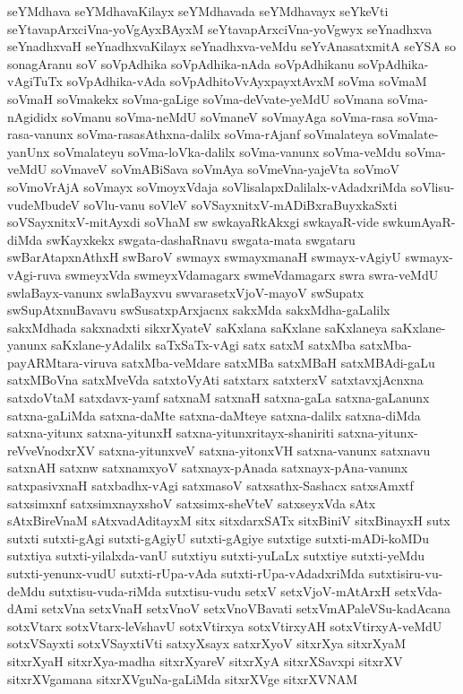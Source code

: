 {seYMdhava
seYMdhavaKilayx
seYMdhavada
seYMdhavayx
seYkeVti
seYtavapArxciVna-yoVgAyxBAyxM
seYtavapArxciVna-yoVgwyx
seYnadhxva
seYnadhxvaH
seYnadhxvaKilayx
seYnadhxva-veMdu
seYvAnasatxmitA
seYSA
so
sonagAranu
soV
soVpAdhika
soVpAdhika-nAda
soVpAdhikanu
soVpAdhika-vAgiTuTx
soVpAdhika-vAda
soVpAdhitoVvAyxpayxtAvxM
soVma
soVmaM
soVmaH
soVmakekx
soVma-gaLige
soVma-deVvate-yeMdU
soVmana
soVma-nAgididx
soVmanu
soVma-neMdU
soVmaneV
soVmayAga
soVma-rasa
soVma-rasa-vanunx
soVma-rasasAthxna-dalilx
soVma-rAjanf
soVmalateya
soVmalate-yanUnx
soVmalateyu
soVma-loVka-dalilx
soVma-vanunx
soVma-veMdu
soVma-veMdU
soVmaveV
soVmABiSava
soVmAya
soVmeVna-yajeVta
soVmoV
soVmoVrAjA
soVmayx
soVmoyxVdaja
soVlisalapxDalilalx-vAdadxriMda
soVlisu-vudeMbudeV
soVlu-vanu
soVleV
soVSayxnitxV-mADiBxraBuyxkaSxti
soVSayxnitxV-mitAyxdi
soVhaM
sw
swkayaRkAkxgi
swkayaR-vide
swkumAyaR-diMda
swKayxkekx
swgata-dashaRnavu
swgata-mata
swgataru
swBarAtapxnAthxH
swBaroV
swmayx
swmayxmanaH
swmayx-vAgiyU
swmayx-vAgi-ruva
swmeyxVda
swmeyxVdamagarx
swmeVdamagarx
swra
swra-veMdU
swlaBayx-vanunx
swlaBayxvu
swvarasetxVjoV-mayoV
swSupatx
swSupAtxnuBavavu
swSusatxpArxjacnx
sakxMda
sakxMdha-gaLalilx
sakxMdhada
sakxnadxti
sikxrXyateV
saKxlana
saKxlane
saKxlaneya
saKxlane-yanunx
saKxlane-yAdalilx
saTxSaTx-vAgi
satx
satxM
satxMba
satxMba-payARMtara-viruva
satxMba-veMdare
satxMBa
satxMBaH
satxMBAdi-gaLu
satxMBoVna
satxMveVda
satxtoVyAti
satxtarx
satxterxV
satxtavxjAcnxna
satxdoVtaM
satxdavx-yamf
satxnaM
satxnaH
satxna-gaLa
satxna-gaLanunx
satxna-gaLiMda
satxna-daMte
satxna-daMteye
satxna-dalilx
satxna-diMda
satxna-yitunx
satxna-yitunxH
satxna-yitunxritayx-shaniriti
satxna-yitunx-reVveVnodxrXV
satxna-yitunxveV
satxna-yitonxVH
satxna-vanunx
satxnavu
satxnAH
satxnw
satxnamxyoV
satxnayx-pAnada
satxnayx-pAna-vanunx
satxpasivxnaH
satxbadhx-vAgi
satxmasoV
satxsathx-Sashacx
satxsAmxtf
satxsimxnf
satxsimxnayxshoV
satxsimx-sheVteV
satxseyxVda
sAtx
sAtxBireVnaM
sAtxvadAditayxM
sitx
sitxdarxSATx
sitxBiniV
sitxBinayxH
sutx
sutxti
sutxti-gAgi
sutxti-gAgiyU
sutxti-gAgiye
sutxtige
sutxti-mADi-koMDu
sutxtiya
sutxti-yilalxda-vanU
sutxtiyu
sutxti-yuLaLx
sutxtiye
sutxti-yeMdu
sutxti-yenunx-vudU
sutxti-rUpa-vAda
sutxti-rUpa-vAdadxriMda
sutxtisiru-vu-deMdu
sutxtisu-vuda-riMda
sutxtisu-vudu
setxV
setxVjoV-mAtArxH
setxVda-dAmi
setxVna
setxVnaH
setxVnoV
setxVnoVBavati
setxVmAPaleVSu-kadAcana
sotxVtarx
sotxVtarx-leVshavU
sotxVtirxya
sotxVtirxyAH
sotxVtirxyA-veMdU
sotxVSayxti
sotxVSayxtiVti
satxyXsayx
satxrXyoV
sitxrXya
sitxrXyaM
sitxrXyaH
sitxrXya-madha
sitxrXyareV
sitxrXyA
sitxrXSavxpi
sitxrXV
sitxrXVgamana
sitxrXVguNa-gaLiMda
sitxrXVge
sitxrXVNAM
}
